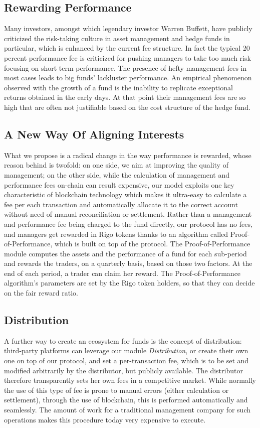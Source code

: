 \documentclass[9pt,oneside]{amsart}
\begin{document}
\begin{multicols}{2}
\section{Rewarding Performance}
Many investors, amongst which legendary investor Warren Buffett, have publicly criticized the risk-taking culture in asset management and hedge funds in particular, which is enhanced by the current fee structure. In fact the typical 20 percent performance fee is criticized for pushing managers to take too much risk focusing on short term performance. The presence of hefty management fees in most cases leads to big funds' lackluster performance. An empirical phenomenon observed with the growth of a fund is the inability to replicate exceptional returns obtained in the early days. At that point their management fees are so high that are often not justifiable based on the cost structure of the hedge fund.

\subsection{A New Way Of Aligning Interests}
What we propose is a radical change in the way performance is rewarded, whose reason behind is twofold: on one side, we aim at improving the quality of management; on the other side, while the calculation of management and performance fees on-chain can result expensive, our model exploits one key characteristic of blockchain technology which makes it ultra-easy to calculate a fee per each transaction and automatically allocate it to the correct account without need of manual reconciliation or settlement.
Rather than a management and performance fee being charged to the fund directly, our protocol has no fees, and managers get rewarded in Rigo tokens thanks to an algorithm called Proof-of-Performance, which is built on top of the protocol.
The Proof-of-Performance module computes the assets and the performance of a fund for each sub-period and rewards the traders, on a quarterly basis, based on those two factors. At the end of each period, a trader can claim her reward.
The Proof-of-Performance algorithm's parameters are set by the Rigo token holders, so that they can decide on the fair reward ratio.

\subsection{Distribution}
A further way to create an ecosystem for funds is the concept of distribution: third-party platforms can leverage our module \textit{Distribution}, or create their own one on top of our protocol, and set a per-transaction fee, which is to be set and modified arbitrarily by the distributor, but publicly available. The distributor therefore transparently sets her own fees in a competitive market. While normally the use of this type of fee is prone to manual errors (either calculation or settlement), through the use of blockchain, this is performed automatically and seamlessly. The amount of work for a traditional management company for such operations makes this procedure today very expensive to execute.


\end{multicols}
\end{document}
